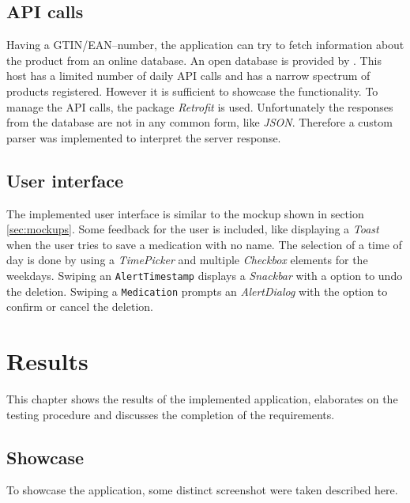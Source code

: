 \documentclass[conference]{IEEEtran}
\begin{document}
\subsection{API calls}

Having a GTIN/EAN--number, the application can try to fetch information about the product from an online database.
An open database is provided by \cite{eandatabase}. This host has a limited number of daily API calls and has a
narrow spectrum of products registered. However it is sufficient to showcase the functionality. To manage the API
calls, the package \textit{Retrofit} \cite{retrofit} is used. Unfortunately the responses from the database are not
in any common form, like \textit{JSON}. Therefore a custom parser was implemented to interpret the server response.

\subsection{User interface}

The implemented user interface is similar to the mockup shown in section \ref{sec:mockups}. Some feedback for the
user is included, like displaying a \textit{Toast} when the user tries to save a medication with no name. The
selection of a time of day is done by using a \textit{TimePicker} and multiple \textit{Checkbox} elements for the
weekdays. Swiping an \texttt{AlertTimestamp} displays a \textit{Snackbar} with a option to undo the deletion.
Swiping a \texttt{Medication} prompts an \textit{AlertDialog} with the option to confirm or cancel the deletion.

\section{Results}

This chapter shows the results of the implemented application, elaborates on the testing procedure and discusses
the completion of the requirements.

\subsection{Showcase}

To showcase the application, some distinct screenshot were taken described here.
\end{document}
